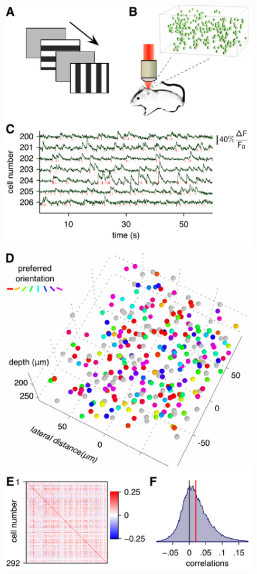 \begin{figure}
\begin{fullpage}
        \begin{center}
        \includegraphics[height=\textheight]{./figures/Acquisition.pdf}
        \end{center}
\end{fullpage}
\end{figure}
